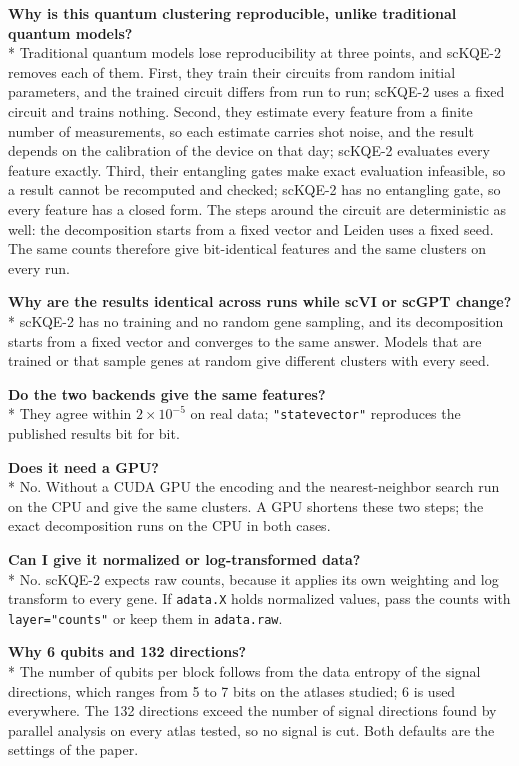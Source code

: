 \documentclass[11pt]{article}
\begin{document}
\textbf{Why is this quantum clustering reproducible, unlike traditional quantum models?}\\*
Traditional quantum models lose reproducibility at three points, and scKQE-2 removes each of them. First, they train their circuits from random initial parameters, and the trained circuit differs from run to run; scKQE-2 uses a fixed circuit and trains nothing. Second, they estimate every feature from a finite number of measurements, so each estimate carries shot noise, and the result depends on the calibration of the device on that day; scKQE-2 evaluates every feature exactly. Third, their entangling gates make exact evaluation infeasible, so a result cannot be recomputed and checked; scKQE-2 has no entangling gate, so every feature has a closed form. The steps around the circuit are deterministic as well: the decomposition starts from a fixed vector and Leiden uses a fixed seed. The same counts therefore give bit-identical features and the same clusters on every run.

\textbf{Why are the results identical across runs while scVI or scGPT change?}\\*
scKQE-2 has no training and no random gene sampling, and its decomposition starts from a fixed vector and converges to the same answer. Models that are trained or that sample genes at random give different clusters with every seed.

\textbf{Do the two backends give the same features?}\\*
They agree within $2 \times 10^{-5}$ on real data; \texttt{"statevector"} reproduces the published results bit for bit.

\textbf{Does it need a GPU?}\\*
No. Without a CUDA GPU the encoding and the nearest-neighbor search run on the CPU and give the same clusters. A GPU shortens these two steps; the exact decomposition runs on the CPU in both cases.

\textbf{Can I give it normalized or log-transformed data?}\\*
No. scKQE-2 expects raw counts, because it applies its own weighting and log transform to every gene. If \texttt{adata.X} holds normalized values, pass the counts with \texttt{layer="counts"} or keep them in \texttt{adata.raw}.

\textbf{Why 6 qubits and 132 directions?}\\*
The number of qubits per block follows from the data entropy of the signal directions, which ranges from 5 to 7 bits on the atlases studied; 6 is used everywhere. The 132 directions exceed the number of signal directions found by parallel analysis on every atlas tested, so no signal is cut. Both defaults are the settings of the paper.
\end{document}
